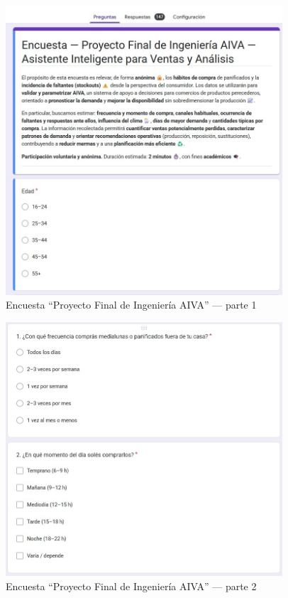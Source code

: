 
\begin{figure}[htbp]
  \centering
  \includegraphics[width=0.92\textwidth]{images/encuesta_p1.png}
  \caption{Encuesta “Proyecto Final de Ingeniería AIVA” — parte 1}
  \label{fig:encuesta-aiva-1}
\end{figure}

\begin{figure}[htbp]
  \centering
  \includegraphics[width=0.92\textwidth]{images/encuesta_p2.png}
  \caption{Encuesta “Proyecto Final de Ingeniería AIVA” — parte 2}
  \label{fig:encuesta-aiva-2}
\end{figure}

